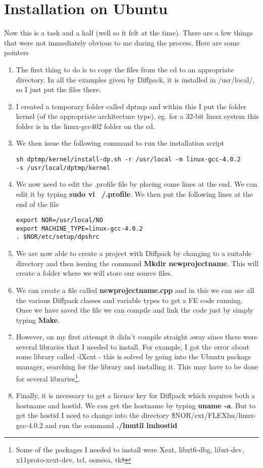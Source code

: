 \section{Installation on Ubuntu}
Now this is a task and a half (well so it felt at the time). There are a few things that were not immediately obvious to me during the process. Here are some pointers
\begin{enumerate}
\item The first thing to do is to copy the files from the cd to an appropriate directory. In all the examples given by Diffpack, it is installed in /usr/local/, so I just put the files there.
\item I created a temporary folder called dptmp and within this I put the folder kernel (of the appropriate architecture type). eg. for a 32-bit linux system this folder is in the linux-gcc402 folder on the cd.
\item We then issue the following command to run the installation script 
\begin{verbatim}
sh dptmp/kernel/install-dp.sh -r /usr/local -m linux-gcc-4.0.2 
-s /usr/local/dptmp/kernel
\end{verbatim}
\item We now need to edit the .profile file by placing come lines at the end. We can edit it by typing {\bf sudo vi ~/.profile}. We then put the following lines at the end of the file
\begin{verbatim}
export NOR=/usr/local/NO
export MACHINE_TYPE=linux-gcc-4.0.2
. $NOR/etc/setup/dpshrc
\end{verbatim} 
\item We are now able to create a project with Diffpack by changing to a suitable directory and then issuing the command {\bf Mkdir newprojectname}. This will create a folder where we will store our source files. 
\item We can create a file called {\bf newprojectname.cpp} and in this we can use all the various Diffpack classes and variable types to get a FE code running. Once we have saved the file we can compile and link the code just by simply typing {\bf Make}.
\item However, on my first attempt it didn't compile straight away since there were several libraries that I needed to install. For example, I got the error about some library called -lXext - this is solved by going into the Ubuntu package manager, searching for the library and installing it. This may have to be done for several libraries\footnote{Some of the packages I needed to install were Xext, libxt6-dbg, libxt-dev, x11proto-xext-dev, tcl, osmesa, tk8}.
\item Finally, it is necessary to get a licence key for Diffpack which requires both a hostname and hostid. We can get the hostname by typing {\bf uname -a}. But to get the hostid I need to change into the directory \$NOR/ext/FLEXlm/linux-gcc-4.0.2 and run the command {\bf ./lmutil lmhostid}
\end{enumerate}

